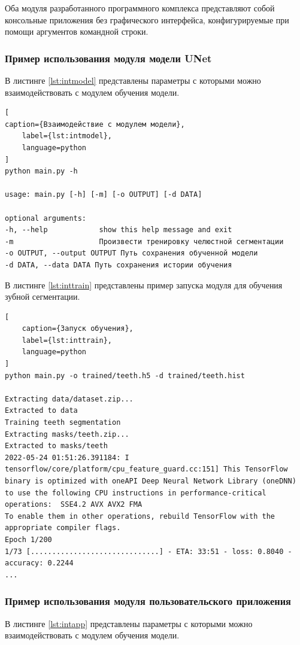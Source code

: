 Оба модуля разработанного программного комплекса представляют собой консольные приложения без графического интерфейса, конфигурируемые при помощи аргументов командной строки.

\subsubsection{Пример использования модуля модели UNet}

В листинге \ref{lst:intmodel} представлены параметры с которыми можно взаимодействовать с модулем обучения модели.

\begin{lstlisting}[
caption={Взаимодействие с модулем модели},
	label={lst:intmodel},
	language=python
]
python main.py -h

usage: main.py [-h] [-m] [-o OUTPUT] [-d DATA]

optional arguments:
-h, --help            show this help message and exit
-m                    Произвести тренировку челюстной сегментации
-o OUTPUT, --output OUTPUT Путь сохранения обученной модели
-d DATA, --data DATA Путь сохранения истории обучения
\end{lstlisting}

В листинге \ref{lst:inttrain} представлены пример запуска модуля для обучения зубной сегментации.

\begin{lstlisting}[
	caption={Запуск обучения},
	label={lst:inttrain},
	language=python
]
python main.py -o trained/teeth.h5 -d trained/teeth.hist

Extracting data/dataset.zip...
Extracted to data
Training teeth segmentation
Extracting masks/teeth.zip...
Extracted to masks/teeth
2022-05-24 01:51:26.391184: I tensorflow/core/platform/cpu_feature_guard.cc:151] This TensorFlow binary is optimized with oneAPI Deep Neural Network Library (oneDNN) to use the following CPU instructions in performance-critical operations:  SSE4.2 AVX AVX2 FMA
To enable them in other operations, rebuild TensorFlow with the appropriate compiler flags.
Epoch 1/200
1/73 [..............................] - ETA: 33:51 - loss: 0.8040 - accuracy: 0.2244
...
\end{lstlisting}

\subsubsection{Пример использования модуля пользовательского приложения}

В листинге \ref{lst:intapp} представлены параметры с которыми можно взаимодействовать с модулем обучения модели.

